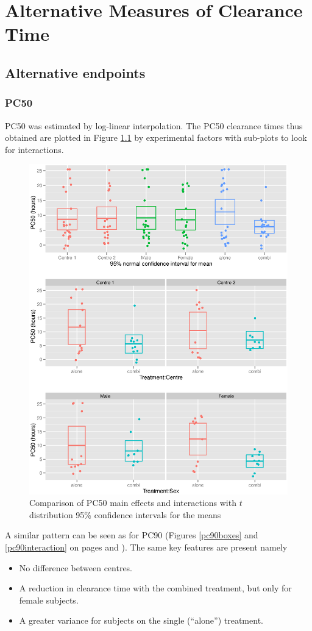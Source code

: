 \chapter{Alternative Measures of Clearance Time}\label{ch:alternative}

\section{Alternative endpoints}
\subsection{PC50}
PC50 was estimated by log-linear interpolation. The PC50 clearance times thus obtained are plotted in Figure \ref{pc50anova} by experimental factors with sub-plots to look for interactions.
\begin{figure}[p]
\includegraphics[width=150mm]{pc50anova.eps} 
\caption{Comparison of PC50 main effects and interactions with $t$ distribution 95\% confidence intervals for the means}
\label{pc50anova}
\end{figure}
A similar pattern can be seen as for PC90 (Figures \ref{pc90boxes} and \ref{pc90interaction} on pages \pageref{pc90boxes} and \pageref{pc90interaction}). The same key features are present namely
\begin{itemize}
\item No difference between centres.
\item A reduction in clearance time with the combined treatment, but only for female subjects.
\item A greater variance for subjects on the single (``alone'') treatment.
\end{itemize}

